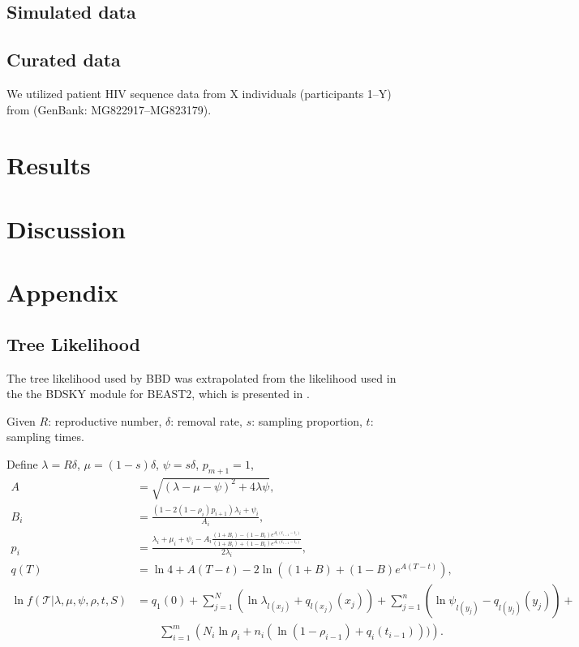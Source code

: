 \documentclass{article}
\begin{document}
		\subsection{Simulated data}
		
		\subsection{Curated data}
			We utilized patient HIV sequence data from X individuals (participants 1--Y) from \cite{blinddating} (GenBank: MG822917--MG823179).
		
	\section*{Results}
	
	
	\section*{Discussion}
	
	
	\printbibliography{}
	
	\section*{Appendix}
		\subsection{Tree Likelihood}
			The tree likelihood used by BBD was extrapolated from the likelihood used in the the BDSKY module for BEAST2, which is presented in \cite{bdsky}{}.
		
			Given $R$: reproductive number, $\delta$: removal rate, $s$: sampling proportion, $t$: sampling times.
			
			Define $\lambda = R \delta$, $\mu =(1 - s) \delta$, $\psi = s \delta$, $p_{m+1} = 1$,
			\begin{align*}
				A &= \sqrt{(\lambda - \mu - \psi)^2 + 4 \lambda \psi}, \\
				B_i &= \frac{(1-2(1-\rho_i)p_{i+1})\lambda_i + \psi_i}{A_i}, \\
				p_i &= \frac{\lambda_i + \mu_i + \psi_i - A_i \frac{(1 + B_i) - (1 - B_i) e^{A_i(t_{i-1}-t_i)}}{(1 + B_i) + (1 - B_i) e^{A_i(t_{i-1}-t_i)}}}{2 \lambda_i}, \\
				q(T) &= \ln{4} + A (T - t) - 2 \ln{\left((1 + B) + (1 - B) e^{A (T - t)}\right)}, \\
				\ln f(\mathcal{T} | \lambda, \mu, \psi, \rho, t, S) &= q_1(0) + \sum_{j=1}^N\left(\ln \lambda_{l(x_j)} + q_{l(x_j)}(x_j)\right) + \sum_{j=1}^n\left(\ln \psi_{l(y_j)} - q_{l(y_j)}(y_j)\right) + \\ &\qquad{}\sum_{i=1}^m \left(N_i \ln \rho_i + n_i (\ln{(1-\rho_{i-1})} + q_{i}(t_{i-1}))) \right).
			\end{align*}
			
\end{document}

